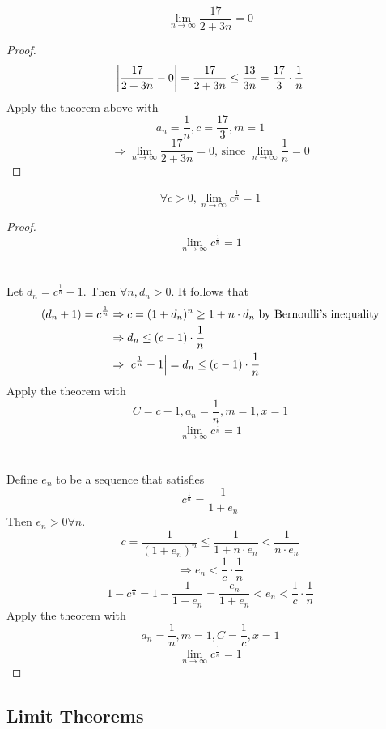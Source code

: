 \documentclass[a4paper,12pt]{article}
\begin{document}
\begin{proposition}
    \[\lim_{n\to\infty}\frac{17}{2+3n}=0\]
    \begin{proof}
        \[\left\lvert \frac{17}{2+3n}-0\right\rvert = \frac{17}{2+3n} \le \frac{13}{3n} = \frac{17}{3}\cdot\frac{1}{n}\]
        Apply the theorem above with \[a_n=\frac{1}{n},c = \frac{17}{3}, m=1\]
        \[\Rightarrow\lim_{n\to\infty}\frac{17}{2+3n}=0\text{, since }\lim_{n\to\infty}\frac{1}{n}=0\]
    \end{proof}
\end{proposition}

\newpage
\begin{proposition}
    \[\forall c>0, \lim_{n\to\infty}c^{\frac{1}{n}}=1\]
    \begin{proof}

         \[\lim_{n\to\infty}c^{\frac{1}{n}}=1\]
        \\\\
        Let \(d_n = c^{\frac{1}{n}}-1\). Then \(\forall n, d_n>0\). It follows that 
        \begin{align*}
            (d_n+1)=c^{\frac{1}{n}} & \Rightarrow c= (1+d_n)^n\ge 1+n\cdot d_n\text{ by Bernoulli's inequality}\\
            & \Rightarrow d_n\le (c-1)\cdot \frac{1}{n} \\
            & \Rightarrow \left\lvert c^{\frac{1}{n}}-1\right\rvert = d_n\le (c-1)\cdot\frac{1}{n}
        \end{align*}
        Apply the theorem with \[C = c-1,a_n = \frac{1}{n}, m=1,x=1\]
        \[\lim_{n\to\infty}c^{\frac{1}{n}}=1\]
        \\\\
        Define \(e_n\) to be a sequence that satisfies \[c^{\frac{1}{n}} = \frac{1}{1+e_n}\]
        Then \(e_n>0\forall n\).
        \[c = \frac{1}{(1+e_n)^n}\le\frac{1}{1+n\cdot e_n} < \frac{1}{n\cdot e_n}\]
        \[\Rightarrow e_n < \frac{1}{c}\cdot \frac{1}{n}\]
        \[1-c^{\frac{1}{n}}= 1-\frac{1}{1+e_n}= \frac{e_n}{1+e_n}<e_n<\frac{1}{c}\cdot \frac{1}{n}\]
        Apply the theorem with \[a_n = \frac{1}{n}, m=1,C=\frac{1}{c}, x=1\]
        \[\lim_{n\to\infty} c^\frac{1}{n}=1\]
    \end{proof}
\end{proposition}

\newpage
\subsection{Limit Theorems}
\end{document}

